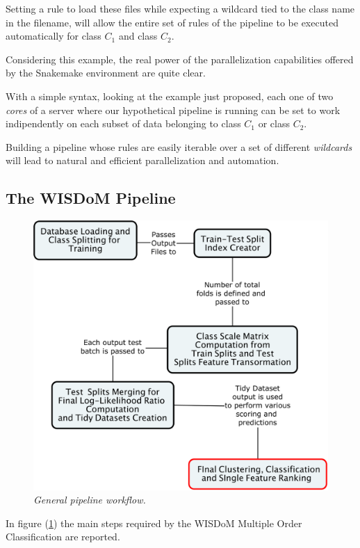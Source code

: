 \documentclass[12pt,openright,twoside,a4paper]{book}
\begin{document}
Setting a rule to load these files while expecting a wildcard tied to the class name in the filename, will allow the entire set of rules of the pipeline to be executed automatically for class $C_1$ and class $C_2$.

Considering this example, the real power of the parallelization capabilities offered by the Snakemake environment are quite clear.

With a simple syntax, looking at the example just proposed, each one of two \textit{cores} of a server where our hypothetical pipeline is running can be set to work indipendently on each subset of data belonging to class $C_1$ or class $C_2$.

Building a pipeline whose rules are easily iterable over a set of different \textit{wildcards} will lead to natural and efficient parallelization and automation.

\subsection{The WISDoM Pipeline}

\begin{figure}[!h]
\centering
\includegraphics[scale=0.3]{General-Pipeline}
\caption{\textit{General pipeline workflow.}}
\label{gpipe}
\end{figure}

In figure (\ref{gpipe}) the main steps required by the WISDoM Multiple Order Classification are reported.
\end{document}
